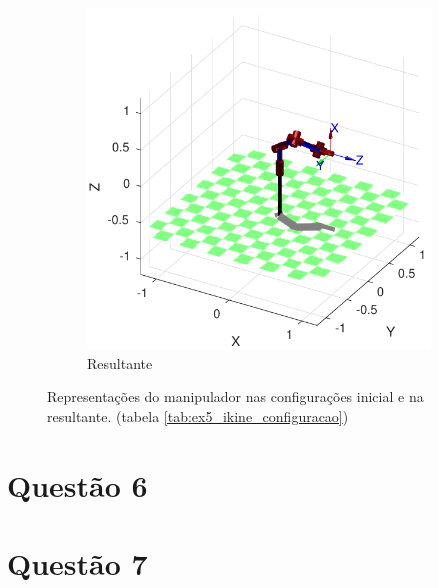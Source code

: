 \documentclass[a4paper,11pt]{article}
\theoremstyle{mytheor}
\begin{document}
\begin{figure}[!ht]
\begin{minipage}{\linewidth}
\begin{subfigure}[b]{0.45\textwidth}
    \includegraphics[width=1\textwidth]{figs/ex5_resposta.pdf}
    \caption{Resultante}
    \end{subfigure}
  \end{minipage}
\caption{Representações do manipulador nas configurações inicial e na resultante. (tabela \ref{tab:ex5_ikine_configuracao})}
\label{fig:ex5_configuracoes}
\end{figure}



\section*{Questão 6}
\section*{Questão 7}
\end{document}
